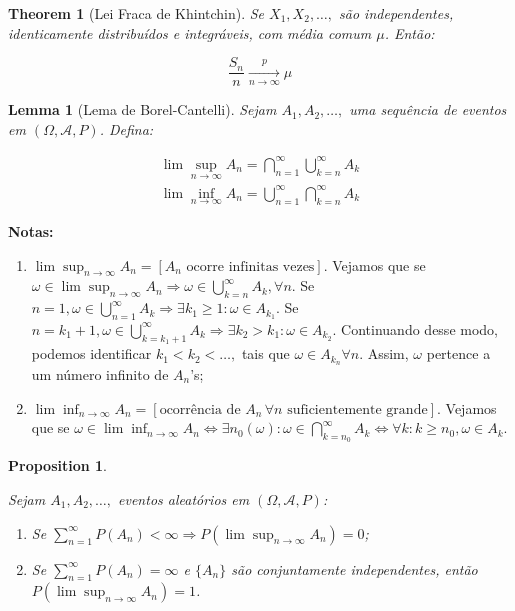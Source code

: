 \documentclass[
]{article}
\newtheorem{theorem}{Theorem}[section]
\newtheorem{lemma}{Lemma}[section]
\newtheorem{proposition}{Proposition}[section]
\theoremstyle{definition}
\theoremstyle{definition}
\theoremstyle{definition}
\theoremstyle{definition}
\theoremstyle{remark}
\begin{document}
\begin{theorem}[Lei Fraca de Khintchin]
Se \(X_{1},X_{2},\ldots,\) são independentes, identicamente distribuídos e integráveis, com média comum \(\mu\). Então:

\begin{equation*}
\frac{S_{n}}{n} \xrightarrow[n \to \infty]{p} \mu
\end{equation*}
\end{theorem}

\begin{lemma}[Lema de Borel-Cantelli]
Sejam \(A_{1},A_{2},\ldots,\) uma sequência de eventos em \((\Omega, \mathcal{A}, P)\). Defina:

\begin{gather*}
\lim\sup_{n \to \infty} A_{n} = \bigcap_{n=1}^{\infty}\bigcup_{k=n}^{\infty}A_{k} \\
\lim\inf_{n \to \infty} A_{n} = \bigcup_{n=1}^{\infty}\bigcap_{k=n}^{\infty}A_{k}
\end{gather*}
\end{lemma}

\textbf{Notas:}

\begin{enumerate}
\def\labelenumi{\alph{enumi})}
\item
  \(\lim\sup_{n \to \infty}A_{n} = [A_{n} \text{ ocorre infinitas vezes}]\). Vejamos que se \(\omega \in \lim\sup_{n \to \infty}A_{n} \Rightarrow \omega \in \bigcup_{k = n}^{\infty}A_{k}, \forall n\). Se \(n = 1, \omega \in \bigcup_{n=1}^{\infty}A_{k} \Rightarrow \exists k_{1} \ge 1 : \omega \in A_{k_{1}}\). Se \(n = k_{1} + 1, \omega \in \bigcup_{k = k_{1} + 1}^{\infty}A_{k} \Rightarrow \exists k_{2} > k_{1} : \omega \in A_{k_{2}}\). Continuando desse modo, podemos identificar \(k_{1} < k_{2} < \ldots,\) tais que \(\omega \in A_{k_{n}} \forall n\). Assim, \(\omega\) pertence a um número infinito de \(A_{n}\)'s;
\item
  \(\lim\inf_{n \to \infty}A_{n} = [\text{ocorrência de } A_{n} \, \forall n \text{ suficientemente grande}]\). Vejamos que se \(\omega \in \lim\inf_{n \to \infty}A_{n} \Leftrightarrow \exists n_{0}(\omega) : \omega \in \bigcap_{k=n_{0}}^{\infty}A_{k} \Leftrightarrow \forall k : k \ge n_{0}, \omega \in A_{k}\).
\end{enumerate}

\begin{proposition}
\protect\hypertarget{prp:somaeventalea}{}\label{prp:somaeventalea}

Sejam \(A_{1}, A_{2}, \ldots,\) eventos aleatórios em \((\Omega, \mathcal{A}, P)\):

\begin{enumerate}
\def\labelenumi{\alph{enumi})}
\item
  Se \(\sum_{n=1}^{\infty}P(A_{n}) < \infty \Rightarrow P\left(\lim\sup_{n \to \infty}A_{n}\right) = 0\);
\item
  Se \(\sum_{n=1}^{\infty}P(A_{n}) = \infty\) e \(\{A_{n}\}\) são conjuntamente independentes, então \(P\left(\lim\sup_{n \to \infty}A_{n}\right) = 1\).
\end{enumerate}

\end{proposition}
\end{document}
